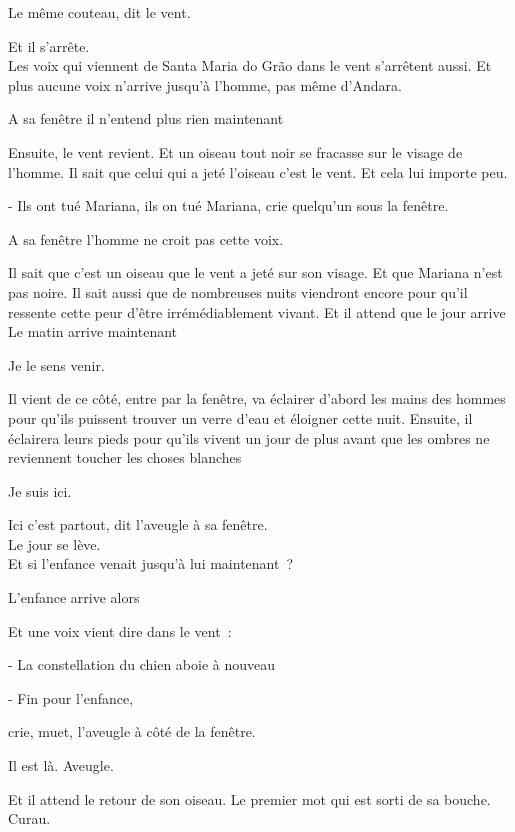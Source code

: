 Le même couteau, dit le vent.

Et il s'arrête.\\

Les voix qui viennent de Santa Maria do Grão dans le vent s'arrêtent
aussi. Et plus aucune voix n'arrive jusqu'à l'homme, pas même d'Andara.

A sa fenêtre il n'entend plus rien maintenant

Ensuite, le vent revient. Et un oiseau tout noir se fracasse sur le
visage de l'homme. Il sait que celui qui a jeté l'oiseau c'est le vent.
Et cela lui importe peu.

- Ils ont tué Mariana, ils on tué Mariana, crie quelqu'un sous la
fenêtre.

A sa fenêtre l'homme ne croit pas cette voix.

Il sait que c'est un oiseau que le vent a jeté sur son visage. Et que
Mariana n'est pas noire. Il sait aussi que de nombreuses nuits viendront
encore pour qu'il ressente cette peur d'être irrémédiablement vivant. Et
il attend que le jour arrive\\

Le matin arrive maintenant

Je le sens venir.

Il vient de ce côté, entre par la fenêtre, va éclairer d'abord les mains
des hommes pour qu'ils puissent trouver un verre d'eau et éloigner cette
nuit. Ensuite, il éclairera leurs pieds pour qu'ils vivent un jour de
plus avant que les ombres ne reviennent toucher les choses blanches

Je suis ici.

Ici c'est partout, dit l'aveugle à sa fenêtre.\\

Le jour se lève.\\

Et si l'enfance venait jusqu'à lui maintenant~?

L'enfance arrive alors

Et une voix vient dire dans le vent~:

- La constellation du chien aboie à nouveau

\pagebreak

- Fin pour l'enfance,

crie, muet, l'aveugle à côté de la fenêtre.

Il est là. Aveugle.

Et il attend le retour de son oiseau. Le premier mot qui est sorti de sa
bouche. Curau.

